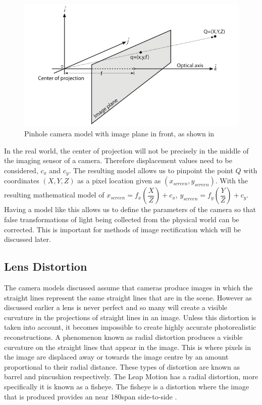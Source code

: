 \documentclass[11pt,oneside]{report}
\begin{document}
				\begin{figure}[!ht]
				\begin{center}
					\includegraphics[scale=0.5]{pinhole2}
					\caption{Pinhole camera model with image plane in front, as shown in \protect{} {\label{fig:pinhole2}}}
				\end{center}
				\end{figure}
				In the real world, the center of projection will not be precisely in the middle of the imaging sensor of a camera.
				Therefore displacement values need to be considered, $c_{x}$ and $c_{y}$.
				The resulting model allows us to pinpoint the point $Q$ with coordinates $(X,Y,Z)$ as a pixel location given as $(x_{screen}, y_{screen})$.
				With the resulting mathematical model of $x_{screen}=f_{x}\left(\dfrac{X}{Z}\right)+c_{x}$, $y_{screen}=f_{y}\left(\dfrac{Y}{Z}\right)+c_{y}$.
				Having a model like this allows us to define the parameters of the camera so that false transformations of light being collected from the physical world can be corrected.
				This is important for methods of image rectification which will be discussed later.
				\subsection{Lens Distortion}
					The camera models discussed assume that cameras produce images in which the straight lines represent the same straight lines that are in the scene.
					However as discussed earlier a lens is never perfect and so many will create a visible curvature in the projections of straight lines in an image.
					Unless this distortion is taken into account, it becomes impossible to create highly accurate photorealistic reconstructions.
					A phenomenon known as radial distortion produces a visible curvature on the straight lines that appear in the image.
					This is where pixels in the image are displaced away or towards the image centre by an amount proportional to their radial distance.
					These types of distortion are known as barrel and pincushion respectively.
					The Leap Motion has a radial distortion, more specifically it is known as a fisheye.
					The fisheye is a distortion where the image that is produced provides an near 180\degree span side-to-side \cite{book:sam}.
					
\end{document}
